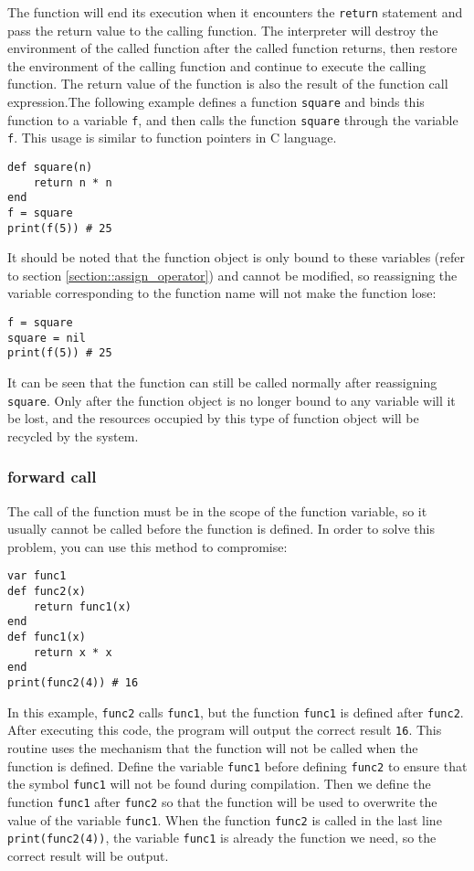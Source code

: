 The function will end its execution when it encounters the \texttt{return} statement and pass the return value to the calling function. The interpreter will destroy the environment of the called function after the called function returns, then restore the environment of the calling function and continue to execute the calling function. The return value of the function is also the result of the function call expression.The following example defines a function \texttt{square} and binds this function to a variable \texttt{f}, and then calls the function \texttt{square} through the variable \texttt{f}. This usage is similar to function pointers in C language.
\begin{lstlisting}[language=berry, numbers=none]
def square(n)
    return n * n
end
f = square
print(f(5)) # 25
\end{lstlisting}
It should be noted that the function object is only bound to these variables (refer to section \ref{section::assign_operator}) and cannot be modified, so reassigning the variable corresponding to the function name will not make the function lose:
\begin{lstlisting}[language=berry, numbers=none]
f = square
square = nil
print(f(5)) # 25
\end{lstlisting}
It can be seen that the function can still be called normally after reassigning \texttt{square}. Only after the function object is no longer bound to any variable will it be lost, and the resources occupied by this type of function object will be recycled by the system.

\subsubsection {forward call}

The call of the function must be in the scope of the function variable, so it usually cannot be called before the function is defined. In order to solve this problem, you can use this method to compromise:
\begin{lstlisting}[language=berry]
var func1
def func2(x)
    return func1(x)
end
def func1(x)
    return x * x
end
print(func2(4)) # 16
\end{lstlisting}
In this example, \texttt{func2} calls \texttt{func1}, but the function \texttt{func1} is defined after \texttt{func2}. After executing this code, the program will output the correct result \texttt{16}. This routine uses the mechanism that the function will not be called when the function is defined. Define the variable \texttt{func1} before defining \texttt{func2} to ensure that the symbol \texttt{func1} will not be found during compilation. Then we define the function \texttt{func1} after \texttt{func2} so that the function will be used to overwrite the value of the variable \texttt{func1}. When the function \texttt{func2} is called in the last line \texttt{print(func2(4))}, the variable \texttt{func1} is already the function we need, so the correct result will be output.

